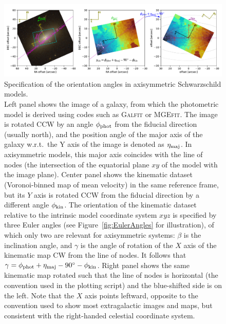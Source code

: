 \documentclass[12pt]{article}
\begin{document}
\begin{figure}
\includegraphics[width=16.5cm]{ForstandAngles.pdf}
\caption{Specification of the orientation angles in axisymmetric Schwarzschild models.\protect\\
Left panel shows the image of a galaxy, from which the photometric model is derived using codes such as \textsc{Galfit} or \textsc{MGEfit}. The image is rotated CCW by an angle $\phi_{\rm phot}$ from the fiducial direction (usually north), and the position angle of the major axis of the galaxy w.r.t.\ the Y axis of the image is denoted as $\eta_{\rm maj}$. In axisymmetric models, this major axis coincides with the line of nodes (the intersection of the equatorial plane $xy$ of the model with the image plane). Center panel shows the kinematic dataset (Voronoi-binned map of mean velocity) in the same reference frame, but its $Y$ axis is rotated CCW from the fiducial direction by a different angle $\phi_{\rm kin}$. The orientation of the kinematic dataset relative to the intrinsic model coordinate system $xyz$ is specified by three Euler angles (see Figure~\ref{fig:EulerAngles} for illustration), of which only two are relevant for axisymmetric systems: $\beta$ is the inclination angle, and $\gamma$ is the angle of rotation of the $X$ axis of the kinematic map CW from the line of nodes. It follows that $\gamma=\phi_{\rm phot} + \eta_{\rm maj} - 90^\circ - \phi_{\rm kin}$. Right panel shows the same kinematic map rotated such that the line of nodes is horizontal (the convention used in the plotting script) and the blue-shifted side is on the left. Note that the $X$ axis points leftward, opposite to the convention used to show most extragalactic images and maps, but consistent with the right-handed celestial coordinate system.
}  \label{fig:ForstandAngles}
\end{figure}
  
\end{document}
